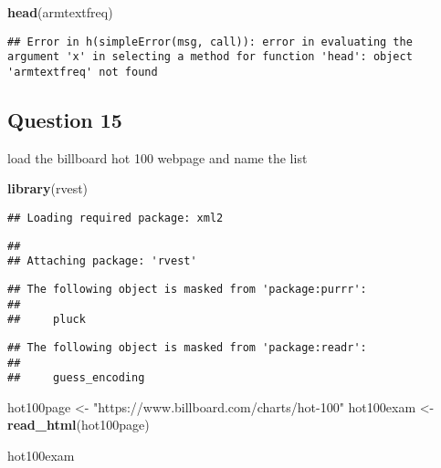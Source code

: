 \documentclass[
]{article}
\newenvironment{Shaded}{\begin{snugshade}}{\end{snugshade}}
\newcommand{\KeywordTok}[1]{\textcolor[rgb]{0.13,0.29,0.53}{\textbf{#1}}}
\newcommand{\NormalTok}[1]{#1}
\newcommand{\StringTok}[1]{\textcolor[rgb]{0.31,0.60,0.02}{#1}}
\begin{document}
\begin{Shaded}
\begin{Highlighting}[]
\KeywordTok{head}\NormalTok{(armtextfreq)}
\end{Highlighting}
\end{Shaded}

\begin{verbatim}
## Error in h(simpleError(msg, call)): error in evaluating the argument 'x' in selecting a method for function 'head': object 'armtextfreq' not found
\end{verbatim}

\hypertarget{question-15}{%
\subsection{Question 15}\label{question-15}}

load the billboard hot 100 webpage and name the list

\begin{Shaded}
\begin{Highlighting}[]
\KeywordTok{library}\NormalTok{(rvest)}
\end{Highlighting}
\end{Shaded}

\begin{verbatim}
## Loading required package: xml2
\end{verbatim}

\begin{verbatim}
## 
## Attaching package: 'rvest'
\end{verbatim}

\begin{verbatim}
## The following object is masked from 'package:purrr':
## 
##     pluck
\end{verbatim}

\begin{verbatim}
## The following object is masked from 'package:readr':
## 
##     guess_encoding
\end{verbatim}

\begin{Shaded}
\begin{Highlighting}[]
\NormalTok{hot100page <-}\StringTok{ "https://www.billboard.com/charts/hot-100"}
\NormalTok{hot100exam <-}\StringTok{ }\KeywordTok{read_html}\NormalTok{(hot100page)}

\NormalTok{hot100exam}
\end{Highlighting}
\end{Shaded}
\end{document}
